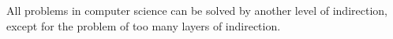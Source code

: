 All problems in computer science can be solved by another level of indirection, except for the problem of too many layers of indirection.
